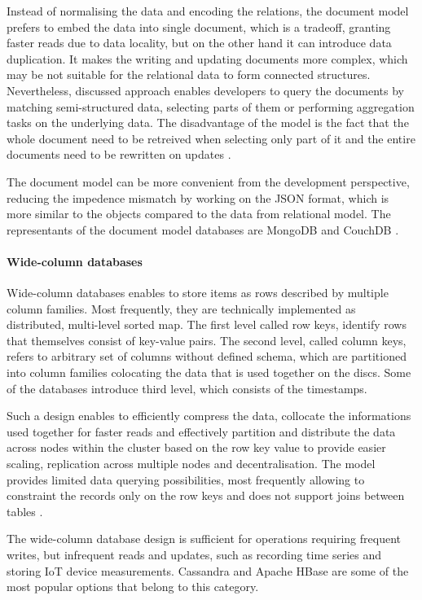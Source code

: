 Instead of normalising the data and encoding the relations, the document model prefers to embed the data into single document, which is a tradeoff, granting faster reads due to data locality, but on the other hand it can introduce data duplication. It makes the writing and updating documents more complex, which may be not suitable for the relational data to form connected structures. Nevertheless, discussed approach enables developers to query the documents by matching semi-structured data, selecting parts of them or performing aggregation tasks on the underlying data. 
The disadvantage of the model is the fact that the whole document need to be retreived when selecting only part of it and the entire documents need to be rewritten on updates \cite{DesignDataIntensiveApplications}.

The document model can be more convenient from the development perspective, reducing the impedence mismatch by working on the JSON format, which is more similar to the objects compared to the data from relational model. The representants of the document model databases are MongoDB \cite{MongoDB} and CouchDB \cite{CouchDB}.

\paragraph{Wide-column databases}

Wide-column databases enables to store items as rows described by multiple column families. Most frequently, they are technically implemented as distributed, multi-level sorted map. The first level called row keys, identify rows that themselves consist of key-value pairs. The second level, called column keys, refers to arbitrary set of columns without defined schema, which are partitioned into column families colocating the data that is used together on the discs. Some of the databases introduce third level, which consists of the timestamps.

Such a design enables to efficiently compress the data, collocate the informations used together for faster reads and effectively partition and distribute the data across nodes within the cluster based on the row key value to provide easier scaling, replication across multiple nodes and decentralisation. The model provides limited data querying possibilities, most frequently allowing to constraint the records only on the row keys and does not support joins between tables \cite{NoSQLDatabaseSystemsSurveyDecisionGuidance}.

The wide-column database design is sufficient for operations requiring frequent writes, but infrequent reads and updates, such as recording time series and storing IoT device measurements. Cassandra \cite{Cassandra} and Apache HBase \cite{HBase} are some of the most popular options that belong to this category.

